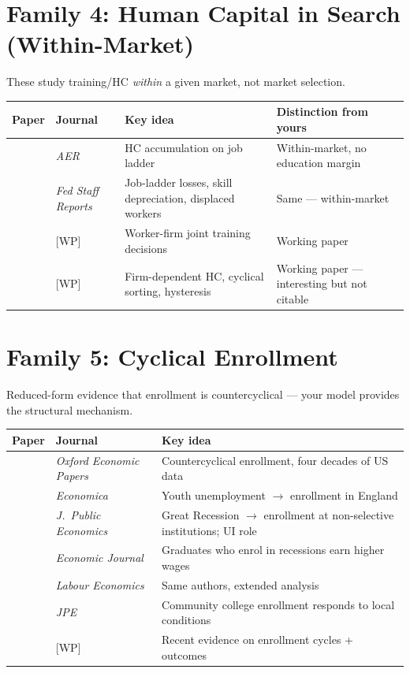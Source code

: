 \documentclass[12pt]{article}
\begin{document}
\section{Family 4: Human Capital in Search (Within-Market)}

These study training/HC \emph{within} a given market, not market selection.

\begin{longtable}{p{3.5cm} p{3cm} p{4cm} p{3.5cm}}
\toprule
\textbf{Paper} & \textbf{Journal} & \textbf{Key idea} & \textbf{Distinction from yours} \\
\midrule
\endhead
\citet{bagger2014} & \emph{AER} & HC accumulation on job ladder & Within-market, no education margin \\[6pt]
\citet{audoly2024} & \emph{Fed Staff Reports} & Job-ladder losses, skill depreciation, displaced workers & Same --- within-market \\[6pt]
\citet{flinn2016} & [WP] & Worker-firm joint training decisions & Working paper \\[6pt]
\citet{acabbi2024} & [WP] & Firm-dependent HC, cyclical sorting, hysteresis & Working paper --- interesting but not citable \\
\bottomrule
\end{longtable}


\section{Family 5: Cyclical Enrollment}

Reduced-form evidence that enrollment is countercyclical --- your model provides the structural mechanism.

\begin{longtable}{p{4.5cm} p{4cm} p{5.5cm}}
\toprule
\textbf{Paper} & \textbf{Journal} & \textbf{Key idea} \\
\midrule
\endhead
\citet{dellas2003} & \emph{Oxford Economic Papers} & Countercyclical enrollment, four decades of US data \\[6pt]
\citet{clark2011} & \emph{Economica} & Youth unemployment $\to$ enrollment in England \\[6pt]
\citet{barr2015} & \emph{J.\ Public Economics} & Great Recession $\to$ enrollment at non-selective institutions; UI role \\[6pt]
\citet{bicakova2021} & \emph{Economic Journal} & Graduates who enrol in recessions earn higher wages \\[6pt]
\citet{bicakova2023} & \emph{Labour Economics} & Same authors, extended analysis \\[6pt]
\citet{blom2021} & \emph{JPE} & Community college enrollment responds to local conditions \\[6pt]
\citet{leibing2026} & [WP] & Recent evidence on enrollment cycles + outcomes \\
\bottomrule
\end{longtable}
\end{document}
